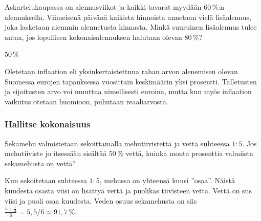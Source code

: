 \begin{tehtavasivu}
\begin{tehtava}
    Askartelukaupassa on alennusviikot ja kaikki tavarat myydään $60\,\%$:n alennuksella. Viimeisenä päivänä kaikista hinnoista annetaan vielä lisäalennus, joka lasketaan aiemmin alennetusta hinnasta. Minkä suuruinen lisäalennus tulee antaa, jos lopullisen kokonaisalennuksen halutaan olevan $80\,\%$?
    \begin{vastaus}
        $50\,\%$
    \end{vastaus}
\end{tehtava}

\begin{tehtava} %
Oletetaan inflaation eli yksinkertaistettuna rahan arvon alenemisen olevan Suomessa eurojen tapauksessa vuosittain keskimäärin yksi prosentti. Talletusten ja sijoitusten arvo voi muuttua nimellisesti euroina, mutta kun myös inflaation vaikutus otetaan huomioon, puhutaan reaaliarvosta.
	\begin{vastaus}
	\end{vastaus}
\end{tehtava} %


\subsubsection*{Hallitse kokonaisuus}

\begin{tehtava}
Sekamehu valmistetaan sekoittamalla mehutiivistettä ja vettä suhteessa $1:5$. Jos mehutiiviste jo itsessään sisältää $50$\,\% vettä, kuinka monta prosenttia valmiista sekamehusta on vettä?
	\begin{vastaus}
	Kun sekoitetaan suhteessa $1:5$, mehussa on yhteensä kuusi ''osaa''. Näistä kuudesta osasta viisi on lisättyä vettä ja puolikas tiivisteen vettä. Vettä on siis viisi ja puoli osaa kuudesta. Veden osuus sekamehusta on siis $\frac{5+\frac{1}{2}}{6}=5,5/6\approx91,7\,\%$.
	\end{vastaus}
\end{tehtava}


\end{tehtavasivu}
